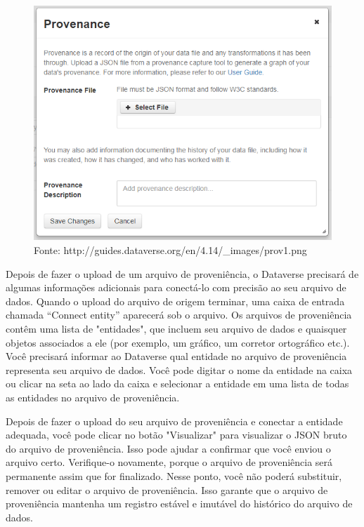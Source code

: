 \documentclass[12pt,hidelinks]{article}
\begin{document}
    
 \begin{figure}[!htp]
                \centering
                \includegraphics[scale=0.7]{prov1.png}
                \caption{Fonte: http://guides.dataverse.org/en/4.14/\_images/prov1.png}
            \label{Proveniência1}
        \end{figure}
    
Depois de fazer o upload de um arquivo de proveniência, o Dataverse precisará de algumas informações adicionais para conectá-lo com precisão ao seu arquivo de dados. Quando o upload do arquivo de origem terminar, uma caixa de entrada chamada “Connect entity” aparecerá sob o arquivo. Os arquivos de proveniência contêm uma lista de "entidades", que incluem seu arquivo de dados e quaisquer objetos associados a ele (por exemplo, um gráfico, um corretor ortográfico etc.). Você precisará informar ao Dataverse qual entidade no arquivo de proveniência representa seu arquivo de dados. Você pode digitar o nome da entidade na caixa ou clicar na seta ao lado da caixa e selecionar a entidade em uma lista de todas as entidades no arquivo de proveniência.

Depois de fazer o upload do seu arquivo de proveniência e conectar a entidade adequada, você pode clicar no botão "Visualizar" para visualizar o JSON bruto do arquivo de proveniência. Isso pode ajudar a confirmar que você enviou o arquivo certo. Verifique-o novamente, porque o arquivo de proveniência será permanente assim que for finalizado. Nesse ponto, você não poderá substituir, remover ou editar o arquivo de proveniência. Isso garante que o arquivo de proveniência mantenha um registro estável e imutável do histórico do arquivo de dados. 
\end{document}
